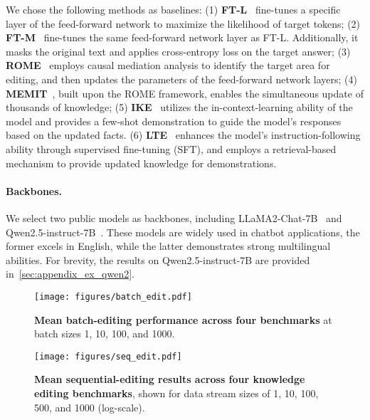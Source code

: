 We chose the following methods as baselines:
%
(1) \textbf{FT-L}~\cite{meng2022locating} fine-tunes a specific layer of the feed-forward network to maximize the likelihood of target tokens;
%
(2) \textbf{FT-M}~\cite{zhang2024comprehensive} fine-tunes the same feed-forward network layer as FT-L. Additionally, it masks the original text and applies cross-entropy loss on the target answer;
%
(3) \textbf{ROME}~\cite{meng2022locating} employs causal mediation analysis to identify the target area for editing, and then updates the parameters of the feed-forward network layers;
%
(4) \textbf{MEMIT}~\cite{meng2022mass}, built upon the ROME framework, enables the simultaneous update of thousands of knowledge;
%
(5) \textbf{IKE}~\cite{zheng2023can} utilizes the in-context-learning ability of the model and provides a few-shot demonstration to guide the model's responses based on the updated facts.
(6) \textbf{LTE}~\cite{jiang2024learning} enhances the model's instruction-following ability through supervised fine-tuning (SFT), and employs a retrieval-based mechanism to provide updated knowledge for demonstrations.

\paragraph{Backbones.} 
We select two public models as backbones, including LLaMA2-Chat-7B~\cite{touvron2023llama} and Qwen2.5-instruct-7B~\cite{yang2024qwen2}. These models are widely used in chatbot applications, the former excels in English, while the latter demonstrates strong multilingual abilities. For brevity, the results on Qwen2.5-instruct-7B are provided in~\ref{sec:appendix_ex_qwen2}.

\begin{figure*}[!t]
\centering
\texttt{[image: figures/batch\_edit.pdf]}
\caption{
\textbf{Mean batch-editing performance across four benchmarks} at batch sizes 1, 10, 100, and 1000.
}
\label{fig:batch_edit}
\end{figure*}

\begin{figure}[!t]
\centering
\texttt{[image: figures/seq\_edit.pdf]}
\caption{
\textbf{Mean sequential-editing results across four knowledge editing benchmarks}, shown for data stream sizes of 1, 10, 100, 500, and 1000 (log-scale).
}
\label{fig:seq_edit}
\end{figure}

